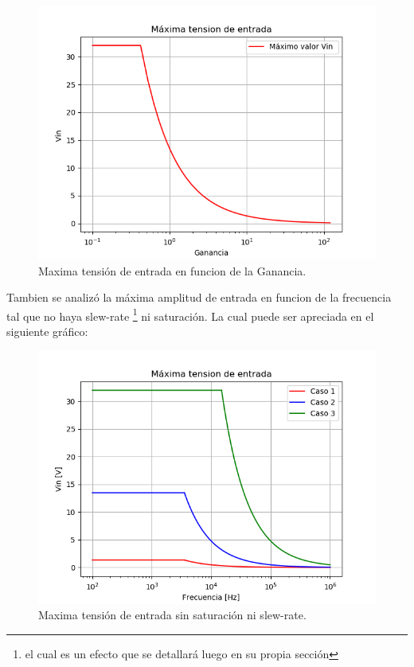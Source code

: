 \begin{figure}[H]	
	\centering
	\includegraphics[width=\textwidth]{Ejercicio1/Imagenes/maxvin.png}
	\caption{Maxima tensión de entrada en funcion de la Ganancia.}
	\label{fig:MaxVin}
\end{figure} 
Tambien se analizó la máxima amplitud de entrada en funcion de la frecuencia tal que no haya slew-rate \footnote{el cual es un efecto que se detallará luego en su propia sección} ni saturación.
La cual puede ser apreciada en el siguiente gráfico:
\begin{figure}[H]	
	\centering
	\includegraphics[width=\textwidth]{Ejercicio1/Imagenes/maxvinsr.png}
	\caption{Maxima tensión de entrada sin saturación ni slew-rate.}
	\label{fig:MaxVinsr}
\end{figure} 
